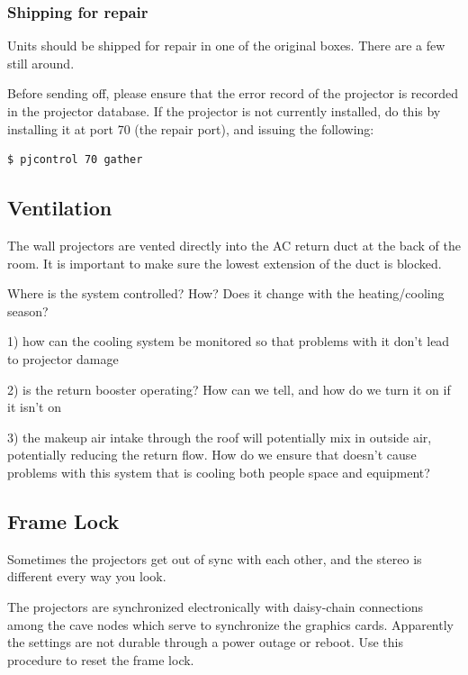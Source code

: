 \documentclass[11pt]{article}
\begin{document}
\subsubsection{Shipping for repair}

Units should be shipped for repair in one of the original boxes. There
are a few still around.

Before sending off, please ensure that the error record of the
projector is recorded in the projector database. If the projector is
not currently installed, do this by installing it at port 70 (the
repair port), and issuing the following:

\begin{verbatim}
$ pjcontrol 70 gather
\end{verbatim}




\subsection{Ventilation}

The wall projectors are vented directly into the AC return duct at the
back of the room.  It is important to make sure the lowest extension
of the duct is blocked.

Where is the system controlled?  How?  Does it change with the
heating/cooling season?

1) how can the cooling system be monitored so that problems with it
don’t lead to projector damage

2) is the return booster operating?  How can we tell, and how do we
turn it on if it isn’t on

3) the makeup air intake through the roof will potentially mix in
outside air, potentially reducing the return flow.  How do we ensure
that doesn’t cause problems with this system that is cooling both
people space and equipment?


\subsection{Frame Lock}
\label{framelock}

Sometimes the projectors get out of sync with each other, and the
stereo is different every way you look.

The projectors are synchronized electronically with daisy-chain
connections among the cave nodes which serve to synchronize the
graphics cards.  Apparently the settings are not durable through a
power outage or reboot.  Use this procedure to reset the frame lock.
\end{document}

